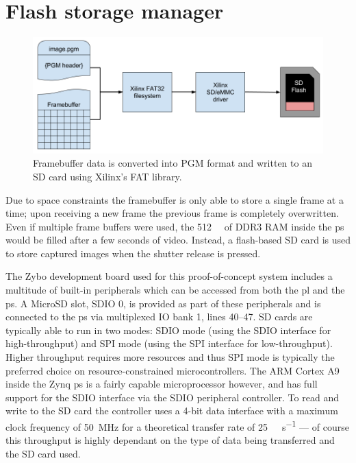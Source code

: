 \section{Flash storage manager}

\begin{figure}
  \centering
  \includegraphics[width=1\textwidth]{./img/flash_storage.png}
  \caption{Framebuffer data is converted into PGM format and written to an SD card using Xilinx's FAT library.}
  \label{fig:flash_storage}
\end{figure}

Due to space constraints the framebuffer is only able to store a single frame at a time; upon receiving a new frame the previous frame is completely overwritten. Even if multiple frame buffers were used, the \SI{512}{\mega\byte} of DDR3 RAM inside the \gls{ps} would be filled after a few seconds of video. Instead, a flash-based SD card is used to store captured images when the shutter release is pressed. 

The Zybo development board used for this proof-of-concept system includes a multitude of built-in peripherals which can be accessed from both the \gls{pl} and the \gls{ps}. A MicroSD slot, SDIO 0, is provided as part of these peripherals and is connected to the \gls{ps} via multiplexed IO bank 1, lines 40--47. SD cards are typically able to run in two modes: SDIO mode (using the SDIO interface for high-throughput) and SPI mode (using the SPI interface for low-throughput). Higher throughput requires more resources and thus SPI mode is typically the preferred choice on resource-constrained microcontrollers. The ARM Cortex A9 inside the Zynq \gls{ps} is a fairly capable microprocessor however, and has full support for the SDIO interface via the SDIO peripheral controller. To read and write to the SD card the controller uses a 4-bit data interface with a maximum clock frequency of \SI{50}{\mega\hertz} for a theoretical transfer rate of \SI{25}{\mega\byte\per\second} --- of course this throughput is highly dependant on the type of data being transferred and the SD card used.

